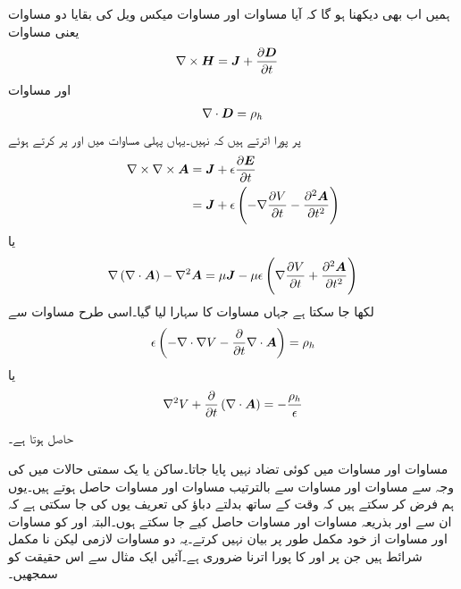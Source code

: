 ہمیں اب بھی دیکھنا ہو گا کہ آیا مساوات  اور مساوات  میکس ویل  کی بقایا دو مساوات یعنی مساوات  
\begin{align*}
\nabla \times {\ensuremath{{\boldsymbol{H}}}}&={{\boldsymbol{J}}}+\frac{\partial {\ensuremath{{\boldsymbol{D}}}}}{\partial t}
\end{align*}
اور مساوات 
\begin{align*}
\nabla \cdot {\ensuremath{{\boldsymbol{D}}}}=\rho_h
\end{align*}
پر پورا اترتے ہیں کہ نہیں۔یہاں پہلی مساوات میں  اور   پر کرتے ہوئے 
\begin{align*}
\nabla \times \nabla \times {\ensuremath{{\boldsymbol{A}}}}&={{\boldsymbol{J}}}+\epsilon \frac{\partial {\ensuremath{{\boldsymbol{E}}}}}{\partial t}\\
&={{\boldsymbol{J}}}+\epsilon\left(-\nabla \frac{\partial V}{\partial t}- \frac{\partial^2 {{\boldsymbol{A}}}}{\partial t^2} \right) 
\end{align*}
یا
\begin{align}\label{مساوات_میکس_ویل_بدلتی_ج}
\nabla \left(\nabla \cdot {\ensuremath{{\boldsymbol{A}}}} \right)-\nabla^2 {{\boldsymbol{A}}}=\mu {\ensuremath{{\boldsymbol{J}}}}-\mu \epsilon \left(\nabla \frac{\partial V}{\partial t}+ \frac{\partial^2 {{\boldsymbol{A}}}}{\partial t^2} \right)
\end{align}
لکھا جا سکتا ہے جہاں مساوات  کا سہارا لیا گیا۔اسی طرح مساوات  سے
\begin{align*}
\epsilon \left(-\nabla \cdot \nabla V -\frac{\partial}{\partial t}\nabla \cdot  {\ensuremath{{\boldsymbol{A}}}} \right)=\rho_h
\end{align*}
یا
\begin{align}\label{مساوات_میکس_ویل_بدلتی_چ}
\nabla^2 V+\frac{\partial}{\partial t} \left(\nabla \cdot {\ensuremath{{\boldsymbol{A}}}} \right)=-\frac{\rho_h}{\epsilon}
\end{align}

حاصل ہوتا ہے۔

مساوات  اور مساوات  میں کوئی تضاد  نہیں پایا جاتا۔ساکن یا یک سمتی حالات میں  کی وجہ سے  مساوات  اور مساوات  سے بالترتیب مساوات  اور مساوات  حاصل ہوتے ہیں۔یوں ہم فرض کر سکتے ہیں کہ وقت کے ساتھ بدلتے دباؤ کی تعریف یوں کی جا سکتی ہے کہ ان سے  اور  بذریعہ مساوات  اور مساوات  حاصل کیے جا سکتے ہوں۔البتہ  اور  کو مساوات  اور مساوات  از خود مکمل طور پر بیان نہیں کرتے۔یہ دو مساوات لازمی لیکن نا مکمل شرائط ہیں جن پر  اور  کا پورا اترنا ضروری ہے۔آئیں ایک مثال سے اس حقیقت کو سمجھیں۔

